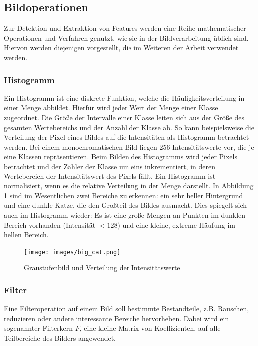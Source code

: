 \subsection{Bildoperationen}

Zur Detektion und Extraktion von Features werden eine Reihe mathematischer Operationen und Verfahren genutzt, wie sie in der Bildverarbeitung üblich sind. Hiervon werden diejenigen vorgestellt, die im Weiteren der Arbeit verwendet werden.

\subsubsection{Histogramm}

Ein Histogramm ist eine diskrete Funktion, welche die Häufigkeitsverteilung in einer Menge abbildet. Hierfür wird jeder Wert der Menge einer Klasse zugeordnet. Die Größe der Intervalle einer Klasse leiten sich aus der Größe des gesamten Wertebereichs und der Anzahl der Klasse ab. So kann beispielsweise die Verteilung der Pixel eines Bildes auf die Intensitäten als Histogramm betrachtet werden. Bei einem monochromatischen Bild liegen 256 Intensitätswerte vor, die je eine Klassen repräsentieren. Beim Bilden des Histogramms wird jeder Pixels betrachtet und der Zähler der Klasse um eins inkrementiert, in deren Wertebereich der Intensitätswert des Pixels fällt. Ein Histogramm ist normalisiert, wenn es die relative Verteilung in der Menge darstellt.
In Abbildung \ref{img:hist} sind im Wesentlichen zwei Bereiche zu erkennen: ein sehr heller Hintergrund und eine dunkle Katze, die den Großteil des Bildes ausmacht. Dies spiegelt sich auch im Histogramm wieder: Es ist eine große Mengen an Punkten im dunklen Bereich vorhanden (Intensität $< 128$) und eine kleine, extreme Häufung im hellen Bereich.

\begin{figure}
	\centering
	\texttt{[image: images/big\_cat.png]}
	\caption{Graustufenbild und Verteilung der Intensitätswerte}
	\label{img:hist}
\end{figure}

\subsubsection{Filter} 
Eine Filteroperation auf einem Bild soll bestimmte Bestandteile, z.B. Rauschen, reduzieren oder andere interessante Bereiche hervorheben. Dabei wird ein sogenannter Filterkern $F$, eine kleine Matrix von Koeffizienten, auf alle Teilbereiche des Bilders angewendet. 

